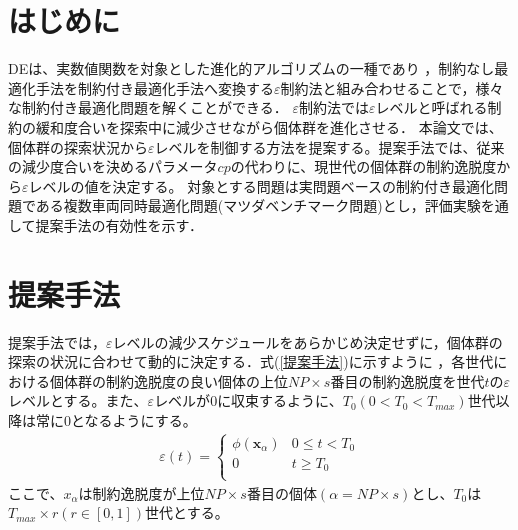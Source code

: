 \documentclass[a4paper,twocolumn,10pt]{jarticle}
\begin{document}



\section{はじめに}

DEは、実数値関数を対象とした進化的アルゴリズムの一種であり
，制約なし最適化手法を制約付き最適化手法へ変換する$\varepsilon$制約法\cite{ε制約法}と組み合わせることで，様々な制約付き最適化問題を解くことができる．
$\varepsilon$制約法では$\varepsilon$レベルと呼ばれる制約の緩和度合いを探索中に減少させながら個体群を進化させる．
本論文では、個体群の探索状況から$\varepsilon$レベルを制御する方法を提案する。提案手法では、従来の減少度合いを決めるパラメータ$cp$の代わりに、現世代の個体群の制約逸脱度から$\varepsilon$レベルの値を決定する。
対象とする問題は実問題ベースの制約付き最適化問題である複数車両同時最適化問題(マツダベンチマーク問題)\cite{マツダベンチマーク問題}とし，評価実験を通して提案手法の有効性を示す．



\section{提案手法}
提案手法では，$\varepsilon$レベルの減少スケジュールをあらかじめ決定せずに，個体群の探索の状況に合わせて動的に決定する．式(\ref{提案手法})に示すように
，各世代における個体群の制約逸脱度の良い個体の上位$NP×s$番目の制約逸脱度を世代$t$の$\varepsilon$レベルとする。また、$\varepsilon$レベルが$0$に収束するように、${T}_0(0<{T}_0<{T}_{max})$世代以降は常に$0$となるようにする。
\begin{eqnarray}
\varepsilon(t)=
\left\{
\begin{array}{cc}
    {\phi({\bm x}_α)} & \mbox{$0\leq t<{T}_0$} \\
    {0} & \mbox{$t\geq{T}_0$}\\
\end{array}
\right.
\label{提案手法}
\end{eqnarray}
ここで、${x}_α$は制約逸脱度が上位$NP×s$番目の個体$(α=NP×s)$とし、${T}_0$は${T}_{max}\times{r}(r\in[0,1])$世代とする。
\end{document}
